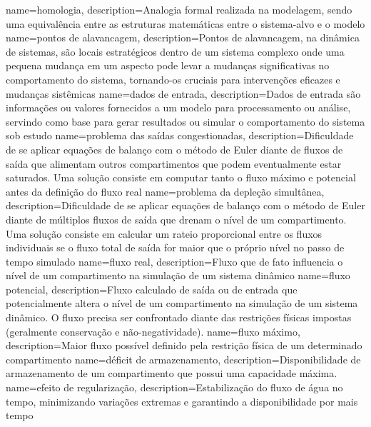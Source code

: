 {
    name=homologia,
    description={Analogia formal realizada na modelagem, sendo uma equivalência entre as estruturas matemáticas entre o sistema-alvo e o modelo}
}
{
    name=pontos de alavancagem,
    description={Pontos de alavancagem, na dinâmica de sistemas, são locais estratégicos dentro de um sistema complexo onde uma pequena mudança em um aspecto pode levar a mudanças significativas no comportamento do sistema, tornando-os cruciais para intervenções eficazes e mudanças sistêmicas}
}
{
    name=dados de entrada,
    description={Dados de entrada são informações ou valores fornecidos a um modelo para processamento ou análise, servindo como base para gerar resultados ou simular o comportamento do sistema sob estudo}
}
{
    name=problema das saídas congestionadas,
    description={Dificuldade de se aplicar equações de balanço com o método de Euler diante de fluxos de saída que alimentam outros compartimentos que podem eventualmente estar saturados. Uma solução consiste em computar tanto o fluxo máximo e potencial antes da definição do fluxo real}
}
{
    name=problema da depleção simultânea,
    description={Dificuldade de se aplicar equações de balanço com o método de Euler diante de múltiplos fluxos de saída que drenam o nível de um compartimento. Uma solução consiste em calcular um rateio proporcional entre os fluxos individuais se o fluxo total de saída for maior que o próprio nível no passo de tempo simulado}
}
{
    name=fluxo real,
    description={Fluxo que de fato influencia o nível de um compartimento na simulação de um sistema dinâmico}
}
{
    name=fluxo potencial,
    description={Fluxo calculado de saída ou de entrada que potencialmente altera o nível de um compartimento na simulação de um sistema dinâmico. O fluxo precisa ser confrontado diante das restrições físicas impostas (geralmente conservação e não-negatividade).}
}
{
    name=fluxo máximo,
    description={Maior fluxo possível definido pela restrição física de um determinado compartimento}
}
{
    name=déficit de armazenamento,
    description={Disponibilidade de armazenamento de um compartimento que possui uma capacidade máxima.}
}
{
    name=efeito de regularização,
    description={Estabilização do fluxo de água no tempo, minimizando variações extremas e garantindo a disponibilidade por mais tempo}
}
